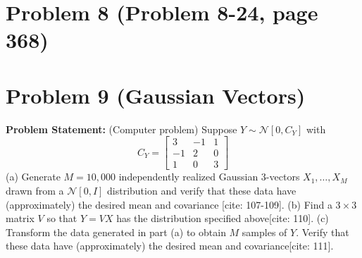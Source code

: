 \documentclass{article}
\begin{document}
\section*{Problem 8 (Problem 8-24, page 368)}

\vspace{1cm}

\section*{Problem 9 (Gaussian Vectors)}
\textbf{Problem Statement:}
(Computer problem) Suppose $Y \sim \mathcal{N}[0, C_Y]$ with
\[ C_Y = \begin{bmatrix} 3 & -1 & 1 \\ -1 & 2 & 0 \\ 1 & 0 & 3 \end{bmatrix} \]
(a) Generate $M = 10,000$ independently realized Gaussian 3-vectors $X_1, \dots, X_M$ drawn from a $\mathcal{N}[0, I]$ distribution and verify that these data have (approximately) the desired mean and covariance [cite: 107-109].
(b) Find a $3 \times 3$ matrix $V$ so that $Y = VX$ has the distribution specified above[cite: 110].
(c) Transform the data generated in part (a) to obtain $M$ samples of $Y$. Verify that these data have (approximately) the desired mean and covariance[cite: 111].
\end{document}
